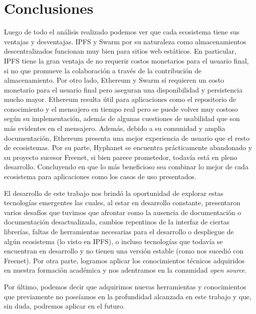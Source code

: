 \section{Conclusiones}

Luego de todo el análisis realizado podemos ver que cada ecosistema tiene sus ventajas y desventajas. IPFS y Swarm por su naturaleza como almacenamientos descentralizados funcionan muy bien para sitios web estáticos. En particular, IPFS tiene la gran ventaja de no requerir costos monetarios para el usuario final, si no que promueve la colaboración a través de la contribución de almacenamiento. Por otro lado, Ethereum y Swarm sí requieren un costo monetario para el usuario final pero aseguran una disponibilidad y persistencia mucho mayor. Ethereum resulta útil para aplicaciones como el repositorio de conocimiento y el mensajero en tiempo real pero se puede volver muy costoso según su implementación, además de algunas cuestiones de usabilidad que son más evidentes en el mensajero. Además, debido a su comunidad y amplia documentación, Ethereum presenta una mejor experiencia de usuario que el resto de ecosistemas. Por su parte, Hyphanet se encuentra prácticamente abandonado y su proyecto sucesor Freenet, si bien parece prometedor, todavía está en pleno desarrollo. Concluyendo en que lo más beneficioso sea combinar lo mejor de cada ecosistema para aplicaciones como los casos de uso presentados.

El desarrollo de este trabajo nos brindó la oportunidad de explorar estas tecnologías emergentes las cuales, al estar en desarrollo constante, presentaron varios desafíos que tuvimos que afrontar como la ausencia de documentación o documentación desactualizada, cambios repentinos de la interfaz de ciertas librerías, faltas de herramientas necesarias para el desarrollo o despliegue de algún ecosistema (lo visto en IPFS), o incluso tecnologías que todavía se encuentran en desarrollo y no tienen una versión estable (como nos sucedió con Freenet). Por otra parte, logramos aplicar los conocimientos técnicos adquiridos en nuestra formación académica y nos adentramos en la comunidad \textit{open source}.

Por último, podemos decir que adquirimos nuevas herramientas y conocimientos que previamente no poseíamos en la profundidad alcanzada en este trabajo y que, sin duda, podremos aplicar en el futuro.

